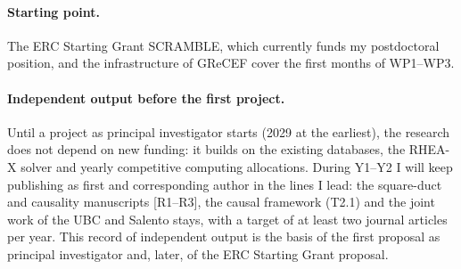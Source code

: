 \documentclass[11pt]{article}
\begin{document}
\paragraph{Starting point.} The ERC Starting Grant SCRAMBLE, which currently funds my
postdoctoral position, and the infrastructure of GReCEF cover the first months of WP1--WP3.

\paragraph{Independent output before the first project.} Until a project as principal
investigator starts (2029 at the earliest), the research does not depend on new funding: it
builds on the existing databases, the RHEA-X solver and yearly competitive computing
allocations. During Y1--Y2 I will keep publishing as first and corresponding author in the
lines I lead: the square-duct and causality manuscripts [R1--R3], the causal framework
(T2.1) and the joint work of the UBC and Salento stays, with a target of at least two journal
articles per year. This record of independent output is the basis of the first proposal as
principal investigator and, later, of the ERC Starting Grant proposal.
\end{document}
